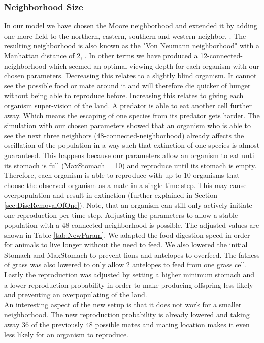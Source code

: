 \documentclass[11pt]{article}
\begin{document}
\subsubsection{Neighborhood Size}
\label{sec:DiscNeighbourhood}
In our model we have chosen the Moore neighborhood and extended it by adding one more field to the northern, eastern, southern and western neighbor, \cite{mooreNeighborhood}. The resulting neighborhood is also known as the "Von Neumann neighborhood" with a Manhattan distance of 2, \cite{vonNeumannNeighborhood}. In other terms we have produced a 12-connected-neighborhood which seemed an optimal viewing depth for each organism with our chosen parameters. Decreasing this relates to a slightly blind organism. It cannot see the possible food or mate around it and will therefore die quicker of hunger without being able to reproduce before. Increasing this relates to giving each organism super-vision of the land. A predator is able to eat another cell further away. Which means the escaping of one species from its predator gets harder. The simulation with our chosen parameters showed that an organism who is able to see the next three neighbors (48-connected-neighborhood) already affects the oscillation of the population in a way such that extinction of one species is almost guaranteed. This happens because our parameters allow an organism to eat until its stomach is full (MaxStomach = 10) and reproduce until its stomach is empty. Therefore, each organism is able to reproduce with up to 10 organisms that choose the observed organism as a mate in a single time-step. This may cause overpopulation and result in extinction (further explained in Section \ref{sec:DiscRemovalOfOne}). Note, that an organism can still only actively initiate one reproduction per time-step. Adjusting the parameters to allow a stable population with a 48-connected-neighborhood is possible. The adjusted values are shown in Table \ref{tab:NewParam}. We adapted the food digestion speed in order for animals to live longer without the need to feed. We also lowered the initial Stomach and MaxStomach to prevent lions and antelopes to overfeed. The fatness of grass was also lowered to only allow 2 antelopes to feed from one grass cell. Lastly the reproduction was adjusted by setting a higher minimum stomach and a lower reproduction probability in order to make producing offspring less likely and preventing an overpopulating of the land.\\
An interesting aspect of the new setup is that it does not work for a smaller neighborhood. The new reproduction probability is already lowered and taking away 36 of the previously 48 possible mates and mating location makes it even less likely for an organism to reproduce. 
\end{document}
